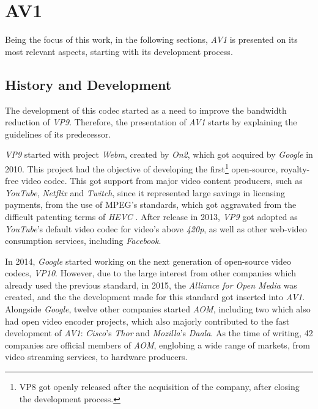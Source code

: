 \section{AV1}

Being the focus of this work, in the following sections, \emph{AV1} is presented on its most relevant aspects, starting with its development process.

\subsection{History and Development}

\nocite{debarghamukherjeeAllThingsRTC2019Opening2019}

The development of this codec started as a need to improve the bandwidth reduction of \emph{VP9}. Therefore, the presentation of \emph{AV1} starts by explaining the guidelines of its predecessor.

\emph{VP9} started with project \emph{Webm}, created by \emph{On2}, which got acquired by \emph{Google} in 2010. This project had the objective of developing the first\footnote{VP8 got openly released after the acquisition of the company, after closing the development process.} open-source, royalty-free video codec. This got support from major video content producers, such as \emph{YouTube}, \emph{Netflix} and \emph{Twitch}, since it represented large savings in licensing payments, from the use of MPEG's standards, which got aggravated from the difficult patenting terms of \emph{HEVC} \cite{streamingmediaHEVCAdvancePatent2015}. After release in 2013, \emph{VP9} got adopted as \emph{YouTube}'s default video codec for video's above \emph{420p}, as well as other web-video consumption services, including \emph{Facebook}.

In 2014, \emph{Google} started working on the next generation of open-source video codecs, \emph{VP10}. However, due to the large interest from other companies which already used the previous standard, in 2015, the \emph{Alliance for Open Media} was created, and the the development made for this standard got inserted into \emph{AV1}. Alongside \emph{Google}, twelve other companies started \emph{AOM}, including two which also had open video encoder projects, which also majorly contributed to the fast development of \emph{AV1}: \emph{Cisco}'s \emph{Thor} and \emph{Mozilla}'s \emph{Daala}. As the time of writing, 42 companies are official members of \emph{AOM}, englobing a wide range of markets, from video streaming services, to hardware producers.

